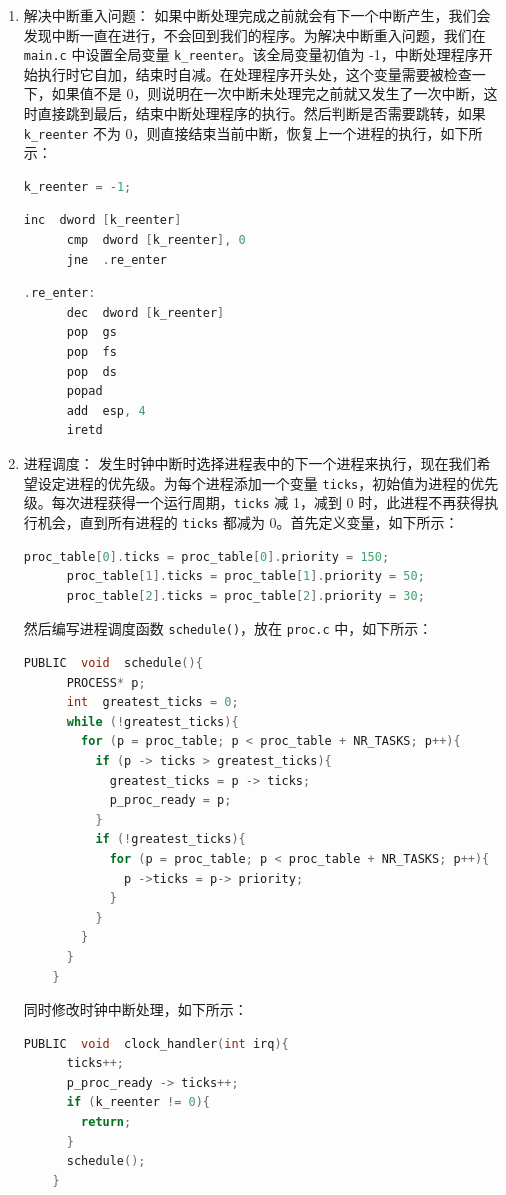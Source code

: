 \begin{enumerate}
    \item 解决中断重入问题：
    如果中断处理完成之前就会有下一个中断产生，我们会发现中断一直在进行，不会回到我们的程序。为解决中断重入问题，我们在 \texttt{main.c} 中设置全局变量 \texttt{k\_reenter}。该全局变量初值为 -1，中断处理程序开始执行时它自加，结束时自减。在处理程序开头处，这个变量需要被检查一下，如果值不是 0，则说明在一次中断未处理完之前就又发生了一次中断，这时直接跳到最后，结束中断处理程序的执行。然后判断是否需要跳转，如果 \texttt{k\_reenter} 不为 0，则直接结束当前中断，恢复上一个进程的执行，如下所示：
    \begin{lstlisting}[language = C]
      k_reenter = -1;
    \end{lstlisting}
    
    \begin{lstlisting}[language = C]
      inc  dword [k_reenter]
      cmp  dword [k_reenter], 0
      jne  .re_enter
    \end{lstlisting}
    
    \begin{lstlisting}[language = C]
    .re_enter:
      dec  dword [k_reenter]
      pop  gs
      pop  fs
      pop  ds
      popad
      add  esp, 4
      iretd
    \end{lstlisting}
    
    \item 进程调度：
    发生时钟中断时选择进程表中的下一个进程来执行，现在我们希望设定进程的优先级。为每个进程添加一个变量 \texttt{ticks}，初始值为进程的优先级。每次进程获得一个运行周期，\texttt{ticks} 减 1，减到 0 时，此进程不再获得执行机会，直到所有进程的 \texttt{ticks} 都减为 0。首先定义变量，如下所示：
    \begin{lstlisting}[language = C]
      proc_table[0].ticks = proc_table[0].priority = 150;
      proc_table[1].ticks = proc_table[1].priority = 50;
      proc_table[2].ticks = proc_table[2].priority = 30;
    \end{lstlisting}
    
    然后编写进程调度函数
    \texttt{schedule()}，放在 \texttt{proc.c} 中，如下所示：
    \begin{lstlisting}[language = C]
    PUBLIC  void  schedule(){
      PROCESS* p;
      int  greatest_ticks = 0;
      while (!greatest_ticks){
        for (p = proc_table; p < proc_table + NR_TASKS; p++){
          if (p -> ticks > greatest_ticks){
            greatest_ticks = p -> ticks;
            p_proc_ready = p;
          }
          if (!greatest_ticks){
            for (p = proc_table; p < proc_table + NR_TASKS; p++){
              p ->ticks = p-> priority;
            }
          }
        }
      }
    }
    \end{lstlisting}
    
    同时修改时钟中断处理，如下所示：
    \begin{lstlisting}[language = C]
    PUBLIC  void  clock_handler(int irq){
      ticks++;
      p_proc_ready -> ticks++;
      if (k_reenter != 0){
        return;
      }
      schedule();
    }
    \end{lstlisting}
\end{enumerate}


